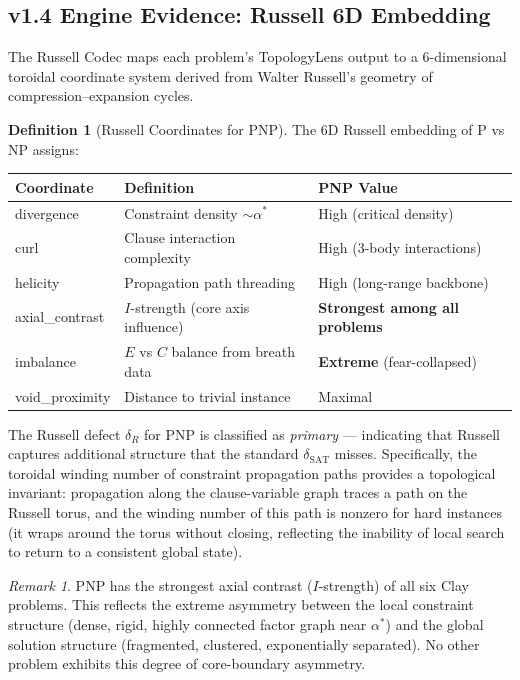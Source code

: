 \documentclass[11pt]{article}
\theoremstyle{definition}
\newtheorem{definition}[theorem]{Definition}
\theoremstyle{remark}
\newtheorem{remark}[theorem]{Remark}
\begin{document}
\subsection{v1.4 Engine Evidence: Russell 6D Embedding}
\label{sec:russell-pnp}

The Russell Codec maps each problem's TopologyLens output to a 6-dimensional
toroidal coordinate system derived from Walter Russell's geometry of
compression--expansion cycles.

\begin{definition}[Russell Coordinates for PNP]
\label{def:russell-pnp}
The 6D Russell embedding of P vs NP assigns:
\begin{center}
\begin{tabular}{@{}lll@{}}
\toprule
\textbf{Coordinate} & \textbf{Definition} & \textbf{PNP Value} \\
\midrule
divergence & Constraint density $\sim \alpha^*$ & High (critical density) \\
curl & Clause interaction complexity & High (3-body interactions) \\
helicity & Propagation path threading & High (long-range backbone) \\
axial\_contrast & $I$-strength (core axis influence) & \textbf{Strongest among all problems} \\
imbalance & $E$ vs $C$ balance from breath data & \textbf{Extreme} (fear-collapsed) \\
void\_proximity & Distance to trivial instance & Maximal \\
\bottomrule
\end{tabular}
\end{center}
\end{definition}

\noindent
The Russell defect $\delta_R$ for PNP is classified as \emph{primary} ---
indicating that Russell captures additional structure that the standard
$\delta_{\mathrm{SAT}}$ misses.  Specifically, the toroidal winding number
of constraint propagation paths provides a topological invariant:
propagation along the clause-variable graph traces a path on the Russell
torus, and the winding number of this path is nonzero for hard instances
(it wraps around the torus without closing, reflecting the inability of
local search to return to a consistent global state).

\begin{remark}
PNP has the strongest axial contrast ($I$-strength) of all six Clay problems.
This reflects the extreme asymmetry between the local constraint structure
(dense, rigid, highly connected factor graph near $\alpha^*$) and the global
solution structure (fragmented, clustered, exponentially separated).  No other
problem exhibits this degree of core-boundary asymmetry.
\end{remark}
\end{document}
